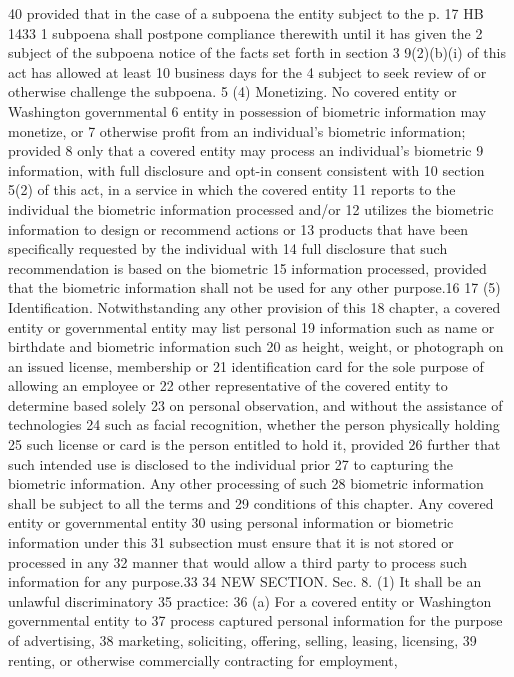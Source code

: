 40 provided that in the case of a subpoena the entity subject to the
p. 17 HB 1433
1 subpoena shall postpone compliance therewith until it has given the
2 subject of the subpoena notice of the facts set forth in section
3 9(2)(b)(i) of this act has allowed at least 10 business days for the
4 subject to seek review of or otherwise challenge the subpoena.
5 (4) Monetizing. No covered entity or Washington governmental
6 entity in possession of biometric information may monetize, or
7 otherwise profit from an individual's biometric information; provided
8 only that a covered entity may process an individual's biometric
9 information, with full disclosure and opt-in consent consistent with
10 section 5(2) of this act, in a service in which the covered entity
11 reports to the individual the biometric information processed and/or
12 utilizes the biometric information to design or recommend actions or
13 products that have been specifically requested by the individual with
14 full disclosure that such recommendation is based on the biometric
15 information processed, provided that the biometric information shall
not be used for any other purpose.16
17 (5) Identification. Notwithstanding any other provision of this
18 chapter, a covered entity or governmental entity may list personal
19 information such as name or birthdate and biometric information such
20 as height, weight, or photograph on an issued license, membership or
21 identification card for the sole purpose of allowing an employee or
22 other representative of the covered entity to determine based solely
23 on personal observation, and without the assistance of technologies
24 such as facial recognition, whether the person physically holding
25 such license or card is the person entitled to hold it, provided
26 further that such intended use is disclosed to the individual prior
27 to capturing the biometric information. Any other processing of such
28 biometric information shall be subject to all the terms and
29 conditions of this chapter. Any covered entity or governmental entity
30 using personal information or biometric information under this
31 subsection must ensure that it is not stored or processed in any
32 manner that would allow a third party to process such information for
any purpose.33
34 NEW SECTION. Sec. 8. (1) It shall be an unlawful discriminatory
35 practice:
36 (a) For a covered entity or Washington governmental entity to
37 process captured personal information for the purpose of advertising,
38 marketing, soliciting, offering, selling, leasing, licensing,
39 renting, or otherwise commercially contracting for employment,
